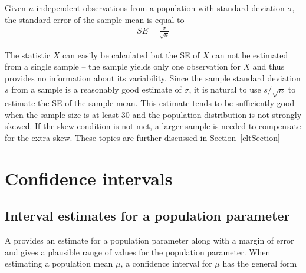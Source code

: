 \begin{spacing}{1.5}



\begin{termBox}{
Given $n$ independent observations from a population with standard deviation $\sigma$, the standard error of the sample mean is equal to \vspace{-1mm}
\begin{eqnarray}
SE = \frac{\sigma}{\sqrt{n}}
\label{seOfXBar}
\end{eqnarray}\vspace{-3mm}%
}
\end{termBox}
The statistic $\overline{X}$ can easily be calculated but the SE of $\overline{X}$ can not be estimated from a single sample -- the sample yields only one observation for $\overline{X}$ and thus provides no information about its variability.  Since the sample standard deviation $s$ from a sample is a reasonably good estimate of $\sigma$, it is natural to use $s/\sqrt{n}$ to estimate the SE of the sample mean.  This estimate tends to be sufficiently good when the sample size is at least 30 and the population distribution is not strongly skewed.  If the skew condition is not met, a larger sample is needed to compensate for the extra skew. These topics are further discussed in Section~\ref{cltSection}


\section[Confidence intervals]{Confidence intervals} %
\label{confidenceIntervals}
\subsection{Interval estimates for a population parameter}

A  provides an estimate for a population parameter along with a margin of error and gives a plausible range of values for the population parameter. When estimating a population mean $\mu$, a confidence interval for $\mu$ has the general form


\end{spacing}
